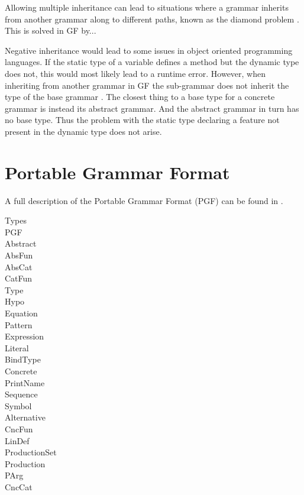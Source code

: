 Allowing multiple inheritance can lead to situations where a grammar inherits from another grammar along to different paths, known as the diamond problem \cite{diamongproblem}. This is solved in GF by... \cite{gfdiamondsolution}

Negative inheritance would lead to some issues in object oriented programming languages. If the static type \cite{statictype} of a variable defines a method but the dynamic type \cite{dynamictype} does not, this would most likely lead to a runtime error. However, when inheriting from another grammar in GF the sub-grammar does not inherit the type of the base grammar \cite{grammartype}. The closest thing to a base type for a concrete grammar is instead its abstract grammar. And the abstract grammar in turn has no base type. Thus the problem with the static type declaring a feature not present in the dynamic type does not arise.

\section{Portable Grammar Format}
\label{sec:pgf}
A full description of the Portable Grammar Format (PGF) can be found in \cite{Angelov}.

\begin{description}
\item[Types]
\item[PGF]
\item[Abstract]
\item[AbsFun]
\item[AbsCat]
\item[CatFun]
\item[Type]
\item[Hypo]
\item[Equation]
\item[Pattern]
\item[Expression]
\item[Literal]
\item[BindType]
\item[Concrete]
\item[PrintName]
\item[Sequence]
\item[Symbol]
\item[Alternative]
\item[CncFun]
\item[LinDef]
\item[ProductionSet]
\item[Production]
\item[PArg]
\item[CncCat]
\end{description}
